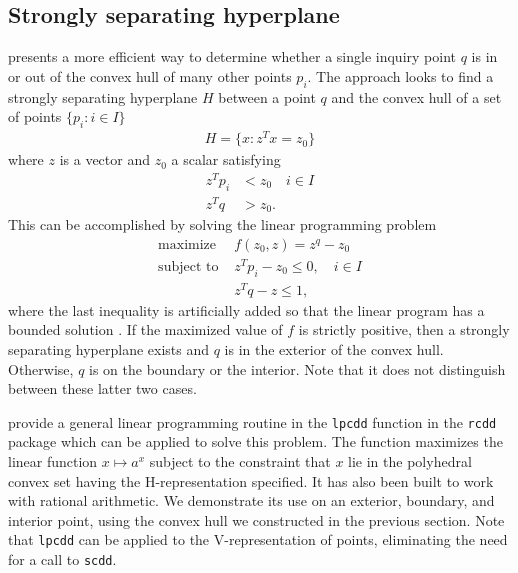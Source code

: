 \subsection{Strongly separating hyperplane} \label{S:Strong H}
\citet{Fukuda:2008} presents a more efficient way to determine whether a single 
inquiry point $q$ is in or out of the convex hull of many other points $p_i$.  
The approach looks to find a strongly separating hyperplane $H$ between a 
point $q$ and the convex hull of a set of points $\{p_i : i \in I\}$
\begin{align*}
	H = \{x : z^T x = z_0\}
\end{align*}
where $z$ is a vector and $z_0$ a scalar satisfying
\begin{align*}
		z^T p_i &< z_0 \quad i \in I \\
		z^Tq &> z_0.
\end{align*}
This can be accomplished by solving the linear programming problem
\begin{align*}
	\text{maximize } 	&f(z_0, z) = z^q - z_0 \\
	\text{subject to } 	&z^T p_i - z_0 \leq 0, \quad i \in I \\
						&z^Tq - z \leq 1, 
\end{align*}
where the last inequality is artificially added so that the linear program 
has a bounded solution \citep{Fukuda:2008,rcdd:R}.  If the maximized value of 
$f$ is strictly positive, then a strongly separating hyperplane exists and 
$q$ is in the exterior of the convex hull.  Otherwise, $q$ is on the boundary or 
the interior.  Note that it does not distinguish between these latter two cases.

\citet{rcdd:R} provide a general linear programming routine in the
\texttt{lpcdd} function in the \texttt{rcdd} package which can be applied to solve this problem.  The function maximizes the linear function $x \mapsto a^x$ 
subject to the constraint that $x$ lie in the polyhedral convex set having 
the H-representation specified.  It has also been built to work with 
rational arithmetic.
We demonstrate its use on an exterior, boundary, and interior
point, using the convex hull we constructed in the previous section.  Note that \texttt{lpcdd} can be applied to the V-representation of points, eliminating
the need for a call to \texttt{scdd}.
